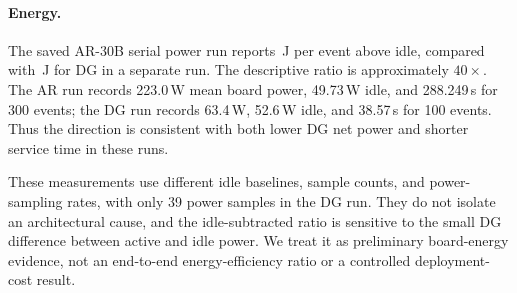 \paragraph{Energy.}
The saved AR-30B serial power run reports \arEnergy\,J per event
above idle, compared with \dgEnergy\,J for DG in a separate run.
The descriptive ratio is approximately $40\times$. The AR run records
223.0\,W mean board power, 49.73\,W idle, and 288.249\,s for 300
events; the DG run records 63.4\,W, 52.6\,W idle, and 38.57\,s for
100 events. Thus the direction is consistent with both lower DG net
power and shorter service time in these runs.

These measurements use different idle baselines, sample counts, and
power-sampling rates, with only 39 power samples in the DG run.
They do not isolate an architectural cause, and the idle-subtracted
ratio is sensitive to the small DG difference between active and idle
power. We treat it as preliminary board-energy evidence, not an
end-to-end energy-efficiency ratio or a controlled deployment-cost result.
